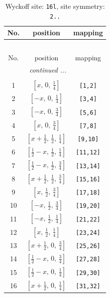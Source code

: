 \documentclass[fleqn,8pt]{jsarticle}
\begin{document}
\renewcommand{\arraystretch}{1.2}
\begin{longtable}{ccc}
\caption{Wyckoff site: {\tt 16l}, site symmetry: {\tt 2..}}
 \\
 \hline \hline
No. & position & mapping \\ \hline \endfirsthead

\multicolumn{2}{l}{\tablename\ \thetable{}} \\
 \hline \hline
No. & position & mapping \\ \hline \endhead

 \hline \hline
\multicolumn{2}{r}{\footnotesize\it continued ...} \\ \endfoot

 \hline \hline
\multicolumn{2}{r}{} \\ \endlastfoot

1 & $\left[ x,\, 0,\, \frac{1}{4} \right]$ & {\tt [1,2]} \\ \hline
2 & $\left[ - x,\, 0,\, \frac{1}{4} \right]$ & {\tt [3,4]} \\ \hline
3 & $\left[ - x,\, 0,\, \frac{3}{4} \right]$ & {\tt [5,6]} \\ \hline
4 & $\left[ x,\, 0,\, \frac{3}{4} \right]$ & {\tt [7,8]} \\ \hline
5 & $\left[ x + \frac{1}{2},\, \frac{1}{2},\, \frac{1}{4} \right]$ & {\tt [9,10]} \\ \hline
6 & $\left[ \frac{1}{2} - x,\, \frac{1}{2},\, \frac{1}{4} \right]$ & {\tt [11,12]} \\ \hline
7 & $\left[ \frac{1}{2} - x,\, \frac{1}{2},\, \frac{3}{4} \right]$ & {\tt [13,14]} \\ \hline
8 & $\left[ x + \frac{1}{2},\, \frac{1}{2},\, \frac{3}{4} \right]$ & {\tt [15,16]} \\ \hline
9 & $\left[ x,\, \frac{1}{2},\, \frac{3}{4} \right]$ & {\tt [17,18]} \\ \hline
10 & $\left[ - x,\, \frac{1}{2},\, \frac{3}{4} \right]$ & {\tt [19,20]} \\ \hline
11 & $\left[ - x,\, \frac{1}{2},\, \frac{1}{4} \right]$ & {\tt [21,22]} \\ \hline
12 & $\left[ x,\, \frac{1}{2},\, \frac{1}{4} \right]$ & {\tt [23,24]} \\ \hline
13 & $\left[ x + \frac{1}{2},\, 0,\, \frac{3}{4} \right]$ & {\tt [25,26]} \\ \hline
14 & $\left[ \frac{1}{2} - x,\, 0,\, \frac{3}{4} \right]$ & {\tt [27,28]} \\ \hline
15 & $\left[ \frac{1}{2} - x,\, 0,\, \frac{1}{4} \right]$ & {\tt [29,30]} \\ \hline
16 & $\left[ x + \frac{1}{2},\, 0,\, \frac{1}{4} \right]$ & {\tt [31,32]} \\
\end{longtable}
\end{document}
